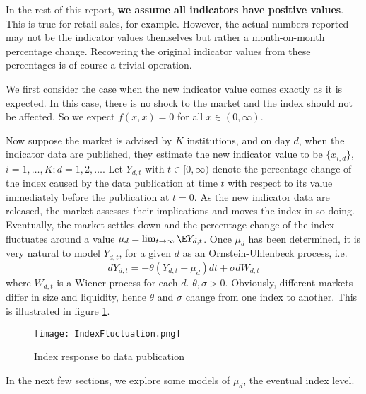 \documentclass[a4paper,11pt,pdftex,twoside,titlepage]{article}
\begin{document}
In the rest of this report, {\bf we assume all indicators have
  positive values}. This is true for retail sales, for
example. However, the actual numbers reported may not be the indicator
values themselves but rather a month-on-month percentage
change. Recovering the original indicator values from these
percentages is of course a trivial operation.

We first consider the case when the new indicator value comes
exactly as it is expected. In this case, there is no shock to the market and the
index should not be affected. So we expect $f(x, x) = 0$ for all
$x \in (0, \infty)$.

Now suppose the market is advised by $K$ institutions, and on day $d$,
when the indicator data are published, they estimate the new indicator
value to be $\{x_{i,d}\}$, $i=1, \dots, K; d=1,2,\dots$.
Let $Y_{d,t}$ with $t \in [0, \infty)$ denote the percentage change of
the index caused by the data publication at time $t$ with respect to its value
immediately before the publication at $t = 0$. As the new indicator
data are released, the market assesses their implications and moves the
index in so doing. Eventually, the market settles down and the
percentage change of the index fluctuates around a value
$\mu_d = \lim_{t\to \infty} \E Y_{d, t}$. Once $\mu_d$ has been
determined, it is very natural to model $Y_{d,t}$, for a given $d$ as
an Ornstein-Uhlenbeck process, i.e. 
\begin{equation}
  \label{eq:OU_response}
  d Y_{d,t} = -\theta (Y_{d,t} - \mu_d) dt + \sigma dW_{d,t}
\end{equation}
where $W_{d,t}$ is a Wiener process for each $d$.
$\theta, \sigma > 0$. Obviously, different markets differ in size and
liquidity, hence $\theta$ and $\sigma$ change from one index to
another. This is illustrated in figure \ref{fig:OU_response}.
\begin{figure}[htb!]
  \centering
  \texttt{[image: IndexFluctuation.png]}
  \caption{Index response to data publication}
  \label{fig:OU_response}
\end{figure}
In the next few sections, we explore some models of $\mu_d$, the
eventual index level.
\end{document}
